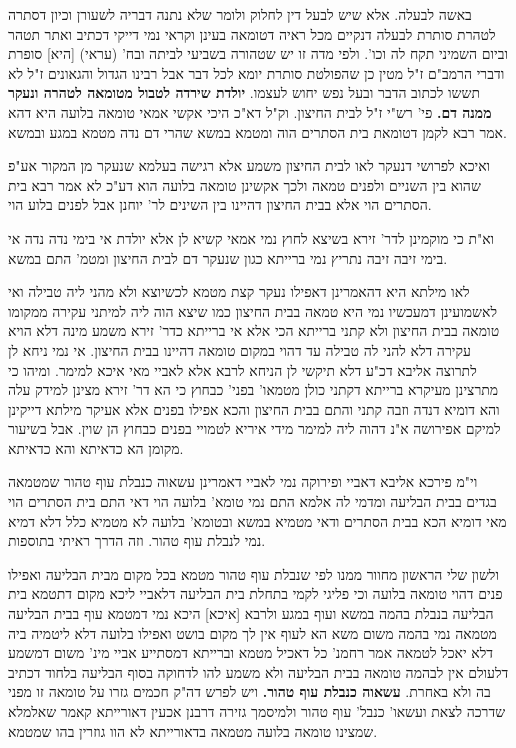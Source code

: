 \documentclass[12pt, openany]{book}
\begin{document}
{באשה לבעלה. אלא שיש לבעל דין לחלוק ולומר שלא נתנה דבריה לשעורן וכיון דסתרה לטהרת סותרת לבעלה דנקיים מכל ראיה דטומאה בעינן וקראי נמי דייקי דכתיב ואתר תטהר וביום השמיני תקח לה וכו'. ולפי מדה זו יש שטהורה בשביעי לביתה ובח' (עראי) [היא] סופרת ודברי הרמב"ם ז"ל מטין כן שהפולטת סותרת יומא לכל דבר אבל רבינו הגדול והגאונים ז"ל לא תששו לכתוב הדבר ובעל נפש יחוש לעצמו. 
\textbf{יולדת שירדה לטבול מטומאה לטהרה ונעקר ממנה דם.}  פי' רש"י ז"ל לבית החיצון. וק"ל דא"כ היכי אקשי אמאי טומאה בלועה היא דהא אמר רבא לקמן דטומאת בית הסתרים הוה ומטמא במשא שהרי דם נדה מטמא במגע ובמשא.\par ואיכא לפרושי דנעקר לאו לבית החיצון משמע אלא רגישה בעלמא שנעקר מן המקור אע"פ שהוא בין השניים ולפנים טמאה ולכך אקשינן טומאה בלועה הוא דע"כ לא אמר רבא בית הסתרים הוי אלא בבית החיצון דהיינו בין השינים לר' יוחנן אבל לפנים בלוע הוי.\par וא"ת כי מוקמינן לדר' זירא בשיצא לחוץ נמי אמאי קשיא לן אלא יולדת אי בימי נדה נדה אי בימי זיבה זיבה נתריץ נמי ברייתא כגון שנעקר דם לבית החיצון ומטמ' התם במשא.\par  לאו מילתא היא דהאמרינן דאפילו נעקר קצת מטמא לכשיוצא ולא מהני ליה טבילה ואי לאשמועינן דמעכשיו נמי היא טמאה בבית החיצון כמו שיצא הוה ליה למיתני עקירה ממקומו טומאה בבית החיצון ולא קתני ברייתא הכי אלא אי ברייתא כדר' זירא משמע מינה דלא הויא עקירה דלא להני לה טבילה עד דהוי במקום טומאה דהיינו בבית החיצון. אי נמי ניחא לן לתרוצה אליבא דכ"ע דלא תיקשי לן הניחא לרבא אלא לאביי מאי איכא למימר. ומיהו כי מתרצינן מעיקרא ברייתא דקתני כולן מטמאו' בפני' כבחוץ כי הא דר' זירא מצינן למידק עלה והא דומיא דנדה וזבה קתני והתם בבית החיצון והכא אפילו בפנים אלא אעיקר מילתא דייקינן למיקם אפירושה א"נ דהוה ליה למימר מידי איריא לטמויי בפנים כבחוץ הן שוין. אבל בשיעור מקומן הא כדאיתא והא כדאיתא.\par  וי"מ פירכא אליבא דאביי ופירוקה נמי לאביי דאמרינן עשאוה כנבלת עוף טהור שמטמאה בגדים בבית הבליעה ומדמי לה אלמא התם נמי טומא' בלועה הוי דאי התם בית הסתרים הוי מאי דומיא הכא בבית הסתרים ודאי מטמיא במשא ובטומא' בלועה לא מטמיא כלל דלא דמיא נמי לנבלת עוף טהור. וזה הדרך ראיתי בתוספות.\par ולשון שלי הראשון מחוור ממנו לפי שנבלת עוף טהור מטמא בכל מקום מבית הבליעה ואפילו פנים דהוי טומאה בלועה וכי פליגי לקמי בתחלת בית הבליעה דלאביי ליכא מקום דתטמא בית הבליעה בנבלת בהמה במשא ועוף במגע ולרבא [איכא] היכא נמי דמטמא עוף בבית הבליעה מטמאה נמי בהמה משום משא הא לעוף אין לך מקום בושט ואפילו בלועה דלא ליטמיה ביה דלא יאכל לטמאה אמר רחמנ' כל דאכיל מטמא וברייתא דמסתייע אביי מינ' משום דמשמע דלעולם אין לבהמה טומאה בבית הבליעה ולא משמע להו לדחוקה בסוף הבליעה בלחוד דכתיב בה ולא באחרת. 
\textbf{עשאוה כנבלת עוף טהור.}  ויש לפרש דה"ק חכמים גזרו על טומאה זו מפני שדרכה לצאת ועשאו' כנבל' עוף טהור ולמיסמך גזירה דרבנן אכעין דאורייתא קאמר שאלמלא שמצינו טומאה בלועה מטמאה בדאורייתא לא הוו גוזרין בהו שמטמא. }
\end{document}

